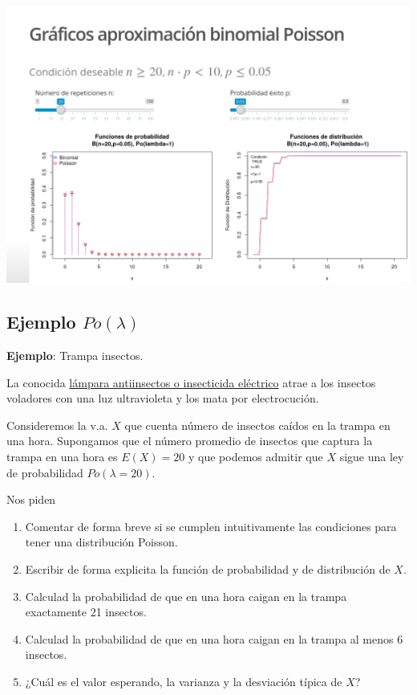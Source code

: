 \documentclass[]{book}
\providecommand{\tightlist}{%
  \setlength{\itemsep}{0pt}\setlength{\parskip}{0pt}}
\begin{document}
\href{https://joanby.shinyapps.io/DistribucionesNotables/}{\includegraphics{Images/noshinyImages/interactiva_poisson1.png}}

\hypertarget{ejemplo-polambda}{%
\subsection{\texorpdfstring{Ejemplo \(Po(\lambda)\)}{Ejemplo Po(\textbackslash{}lambda)}}\label{ejemplo-polambda}}

\textbf{Ejemplo}: Trampa insectos.

La conocida \href{https://es.wikipedia.org/wiki/Insecticida_el\%C3\%A9ctrico}{lámpara antiinsectos o insecticida eléctrico} atrae a los insectos voladores con una luz ultravioleta y los mata por electrocución.

Consideremos la v.a. \(X\) que cuenta número de insectos caídos en la trampa en una hora. Supongamos que el número promedio de insectos que captura la trampa en una hora es \(E(X)=20\) y que podemos admitir que \(X\) sigue una ley de probabilidad \(Po(\lambda=20)\).

Nos piden

\begin{enumerate}
\def\labelenumi{\arabic{enumi}.}
\tightlist
\item
  Comentar de forma breve si se cumplen intuitivamente las condiciones para tener una distribución Poisson.
\item
  Escribir de forma explicita la función de probabilidad y de distribución de \(X\).
\item
  Calculad la probabilidad de que en una hora caigan en la trampa exactamente 21 insectos.
\item
  Calculad la probabilidad de que en una hora caigan en la trampa al menos 6 insectos.
\item
  ¿Cuál es el valor esperando, la varianza y la desviación típica de \(X\)?
\end{enumerate}
\end{document}
